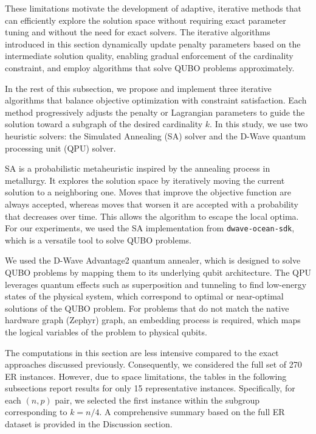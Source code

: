 \documentclass{article}
\begin{document}
These limitations motivate the development of adaptive, iterative methods that can efficiently explore the solution space without requiring exact parameter tuning and without the need for exact solvers. The iterative algorithms introduced in this section dynamically update penalty parameters based on the intermediate solution quality, enabling gradual enforcement of the cardinality constraint, and employ algorithms that solve QUBO problems approximately.


In the rest of this subsection, we propose and implement three iterative algorithms that balance objective optimization with constraint satisfaction. Each method progressively adjusts the penalty or Lagrangian parameters to guide the solution toward a subgraph of the desired cardinality $k$. In this study, we use two heuristic solvers:  the Simulated Annealing (SA) solver and the D-Wave quantum processing unit (QPU) solver. 

SA is a probabilistic metaheuristic inspired by the annealing process in metallurgy. It explores the solution space by iteratively moving the current solution to a neighboring one. Moves that improve the objective function are always accepted, whereas moves that worsen it are accepted with a probability that decreases over time. This allows the algorithm to escape the local optima. For our experiments, we used the SA implementation from \texttt{dwave-ocean-sdk}, which is a versatile tool to solve QUBO problems.

We used the D-Wave Advantage2 quantum annealer, which is designed to solve QUBO problems by mapping them to its underlying qubit architecture. The QPU leverages quantum effects such as superposition and tunneling to find low-energy states of the physical system, which correspond to optimal or near-optimal solutions of the QUBO problem.  For problems that do not match the native hardware graph (Zephyr) graph, an embedding process is required, which maps the logical variables of the problem to physical qubits. 

The computations in this section are less intensive compared to the exact approaches discussed previously. Consequently, we considered the full set of 270 ER instances. However, due to space limitations, the tables in the following subsections report results for only 15 representative instances. Specifically, for each $(n, p)$ pair, we selected the first instance within the subgroup corresponding to $k = n/4$. A comprehensive summary based on the full ER dataset is provided in the Discussion section.
\end{document}
